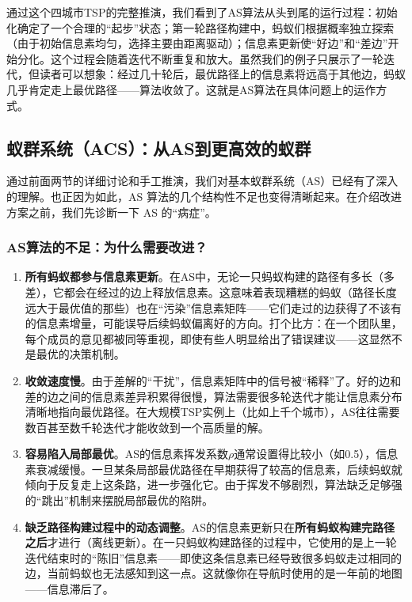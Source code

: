 \documentclass[lang=cn,zihao=-4,a4paper,fontset=windows]{beautybook}
\begin{document}
\begin{fancybox}
通过这个四城市TSP的完整推演，我们看到了AS算法从头到尾的运行过程：初始化确定了一个合理的“起步”状态；第一轮路径构建中，蚂蚁们根据概率独立探索（由于初始信息素均匀，选择主要由距离驱动）；信息素更新使“好边”和“差边”开始分化。这个过程会随着迭代不断重复和放大。虽然我们的例子只展示了一轮迭代，但读者可以想象：经过几十轮后，最优路径上的信息素将远高于其他边，蚂蚁几乎肯定走上最优路径——算法收敛了。这就是AS算法在具体问题上的运作方式。
\end{fancybox}

\subsection{蚁群系统（ACS）：从AS到更高效的蚁群}

通过前面两节的详细讨论和手工推演，我们对基本蚁群系统（AS）已经有了深入的理解。也正因为如此，AS 算法的几个结构性不足也变得清晰起来。在介绍改进方案之前，我们先诊断一下 AS 的“病症”。

\subsubsection{AS算法的不足：为什么需要改进？}

\begin{enumerate}
    \item \textbf{所有蚂蚁都参与信息素更新}。在AS中，无论一只蚂蚁构建的路径有多长（多差），它都会在经过的边上释放信息素。这意味着表现糟糕的蚂蚁（路径长度远大于最优值的那些）也在“污染”信息素矩阵——它们走过的边获得了不该有的信息素增量，可能误导后续蚂蚁偏离好的方向。打个比方：在一个团队里，每个成员的意见都被同等重视，即使有些人明显给出了错误建议——这显然不是最优的决策机制。

    \item \textbf{收敛速度慢}。由于差解的“干扰”，信息素矩阵中的信号被“稀释”了。好的边和差的边之间的信息素差异积累得很慢，算法需要很多轮迭代才能让信息素分布清晰地指向最优路径。在大规模TSP实例上（比如上千个城市），AS往往需要数百甚至数千轮迭代才能收敛到一个高质量的解。

    \item \textbf{容易陷入局部最优}。AS的信息素挥发系数$\rho$通常设置得比较小（如0.5），信息素衰减缓慢。一旦某条局部最优路径在早期获得了较高的信息素，后续蚂蚁就倾向于反复走上这条路，进一步强化它。由于挥发不够剧烈，算法缺乏足够强的“跳出”机制来摆脱局部最优的陷阱。

    \item \textbf{缺乏路径构建过程中的动态调整}。AS的信息素更新只在\textbf{所有蚂蚁构建完路径之后}才进行（离线更新）。在一只蚂蚁构建路径的过程中，它使用的是上一轮迭代结束时的“陈旧”信息素——即使这条信息素已经导致很多蚂蚁走过相同的边，当前蚂蚁也无法感知到这一点。这就像你在导航时使用的是一年前的地图——信息滞后了。
\end{enumerate}
\end{document}
